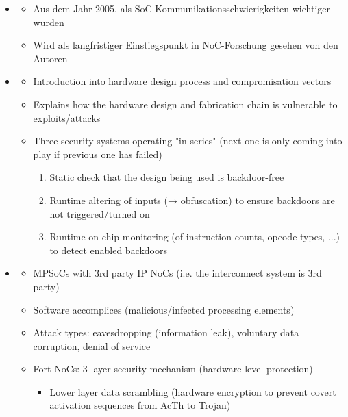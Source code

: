 \begin{itemize}
    \item \textbf{} \checkmark
        \begin{itemize}
            \item Aus dem Jahr 2005, als SoC-Kommunikationsschwierigkeiten wichtiger wurden
            \item Wird als langfristiger Einstiegspunkt in NoC-Forschung gesehen von den Autoren
        \end{itemize}
    \item \textbf{} \checkmark
        \begin{itemize}
            \item Introduction into hardware design process and compromisation vectors
            \item Explains how the hardware design and fabrication chain is vulnerable to exploits/attacks
            \item Three security systems operating "in series" (next one is only coming into play if previous one has failed)
                \begin{enumerate}
                    \item Static check that the design being used is backdoor-free
                    \item Runtime altering of inputs (→ obfuscation) to ensure backdoors are not triggered/turned on
                    \item Runtime on-chip monitoring (of instruction counts, opcode types, ...) to detect enabled backdoors
                \end{enumerate}
        \end{itemize}
    \item \textbf{} \checkmark
        \begin{itemize}
            \item MPSoCs with 3rd party IP NoCs (i.e. the interconnect system is 3rd party)
            \item Software accomplices (malicious/infected processing elements)
            \item Attack types: eavesdropping (information leak), voluntary data corruption, denial of service
            \item Fort-NoCs: 3-layer security mechanism (hardware level protection)
                \begin{itemize}
                    \item Lower layer data scrambling (hardware encryption to prevent covert activation sequences from AcTh to Trojan)

\end{itemize}
\end{itemize}
\end{itemize}
